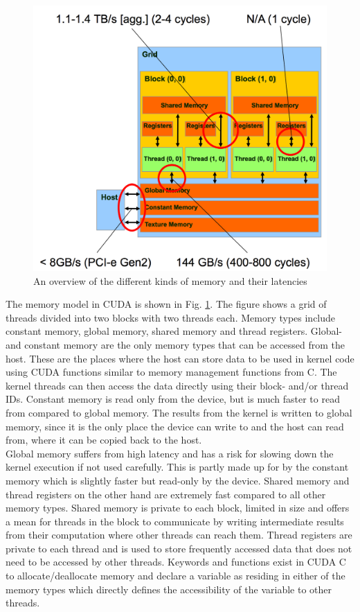 \begin{figure}[ht!]
  \centering
    \includegraphics[scale=0.15]{img/latenstid.png}
  \caption{An overview of the different kinds of memory and their latencies}
  \label{memorylatencies}
\end{figure}

The memory model in CUDA is shown in Fig. \ref{memorylatencies}. The figure shows a grid of threads divided into two blocks with two threads each. Memory types include constant memory, global memory, shared memory and thread registers. Global- and constant memory are the only memory types that can be accessed from the host. These are the places where the host can store data to be used in kernel code using CUDA functions similar to memory management functions from C. The kernel threads can then access the data directly using their block- and/or thread IDs. Constant memory is read only from the device, but is much faster to read from compared to global memory. The results from the kernel is written to global memory, since it is the only place the device can write to and the host can read from, where it can be copied back to the host.\\

Global memory suffers from high latency and has a risk for slowing down the kernel execution if not used carefully. This is partly made up for by the constant memory which is slightly faster but read-only by the device. Shared memory and thread registers on the other hand are extremely fast compared to all other memory types. Shared memory is private to each block, limited in size and offers a mean for threads in the block to communicate by writing intermediate results from their computation where other threads can reach them. Thread registers are private to each thread and is used to store frequently accessed data that does not need to be accessed by other threads. Keywords and functions exist in CUDA C to allocate/deallocate memory and declare a variable as residing in either of the memory types which directly defines the accessibility of the variable to other threads.
